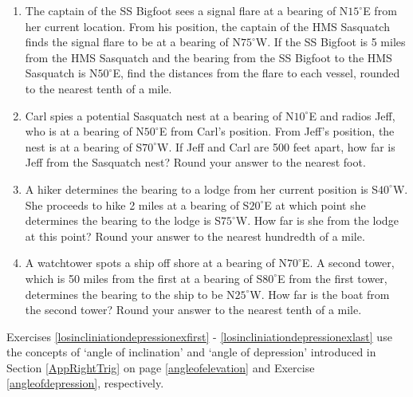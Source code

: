 \documentclass{ximera}
\begin{document}
\begin{enumerate}
\item  The captain of the SS Bigfoot sees a signal flare at a bearing of N$15^{\circ}$E from her current location. From his position, the captain of the HMS Sasquatch finds the signal flare to be at a bearing of N$75^{\circ}$W.  If the SS Bigfoot is 5 miles from the HMS Sasquatch and the bearing from the SS Bigfoot to the HMS Sasquatch is N$50^{\circ}$E, find the distances from the flare to each vessel, rounded to the nearest tenth of a mile.

\item  Carl spies a potential Sasquatch nest at a bearing of N$10^{\circ}$E and radios Jeff, who is at a bearing of N$50^{\circ}$E from Carl's position.  From Jeff's position, the nest is at a bearing of S$70^{\circ}$W. If Jeff and Carl are 500 feet apart, how far is Jeff from the Sasquatch nest?  Round your answer to the nearest foot.

\item  A hiker determines the bearing to a lodge from her current position is S$40^{\circ}$W.  She proceeds to hike 2 miles at a bearing of S$20^{\circ}$E at which point she determines the bearing to the lodge is S$75^{\circ}$W.  How far is she from the lodge at this point?  Round your answer to the nearest hundredth of a mile.

\item \label{bearinglastexercise} A watchtower spots a ship off shore at a bearing of N$70^{\circ}$E.  A second tower, which is 50 miles from the first at a bearing of S$80^{\circ}$E from the first tower, determines the bearing to the ship to be N$25^{\circ}$W. How far is the boat from the second tower?  Round your answer to the nearest tenth of a mile.


\setcounter{HW}{\value{enumi}}

\end{enumerate}

\newpage

Exercises \ref{losincliniationdepressionexfirst} -  \ref{losincliniationdepressionexlast} use the concepts of `angle of inclination' and `angle of depression' introduced in Section \ref{AppRightTrig} on page \ref{angleofelevation} and Exercise \ref{angleofdepression}, respectively.
\end{document}
